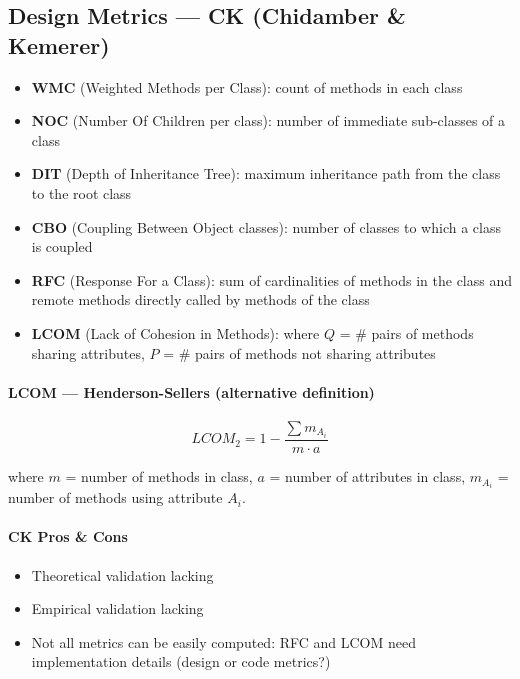 
\subsection{Design Metrics — CK (Chidamber \& Kemerer)}

\begin{itemize}
  \item \textbf{WMC} (Weighted Methods per Class): count of methods in each class
  \item \textbf{NOC} (Number Of Children per class): number of immediate sub-classes of
        a class
  \item \textbf{DIT} (Depth of Inheritance Tree): maximum inheritance path from the class
        to the root class
  \item \textbf{CBO} (Coupling Between Object classes): number of classes to which a class
        is coupled
  \item \textbf{RFC} (Response For a Class): sum of cardinalities of methods in the class
        and remote methods directly called by methods of the class
  \item \textbf{LCOM} (Lack of Cohesion in Methods): where $Q$ = \# pairs of methods
        sharing attributes, $P$ = \# pairs of methods not sharing attributes
\end{itemize}

\paragraph{LCOM --- Henderson-Sellers (alternative definition)}

\[
  LCOM_2 = 1 - \frac{\sum m_{A_i}}{m \cdot a}
\]

where $m$ = number of methods in class, $a$ = number of attributes in class,
$m_{A_i}$ = number of methods using attribute $A_i$.

\paragraph{CK Pros \& Cons}
\begin{itemize}
  \item[$-$] Theoretical validation lacking
  \item[$-$] Empirical validation lacking
  \item[$-$] Not all metrics can be easily computed: RFC and LCOM need implementation
        details (design or code metrics?)
\end{itemize}
